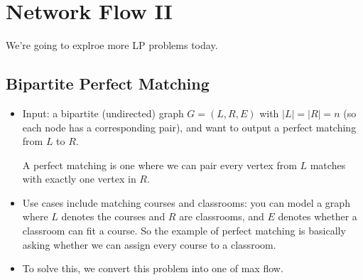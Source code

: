 \section{Network Flow II}

We're going to explroe more LP problems today.

\subsection{Bipartite Perfect Matching}
\begin{itemize}
	\item Input: a bipartite (undirected) graph \(G = (L, R, E)\) with \(|L| = |R| = n\) (so each node 
		has a corresponding pair), and want to output a perfect matching from \(L\) to \( R\).

		A perfect matching is one where we can pair every vertex from \(L\) matches with exactly one vertex 
		in \(R\).
	\item Use cases include matching courses and classrooms: you can model a graph where \(L\) denotes 
		the courses and \(R\) are classrooms, and \(E\) denotes whether a classroom can fit a course.  
		So the example of perfect matching is basically asking whether we can assign every course to a classroom.
	\item To solve this, we convert this problem into one of max flow. 
\end{itemize}

